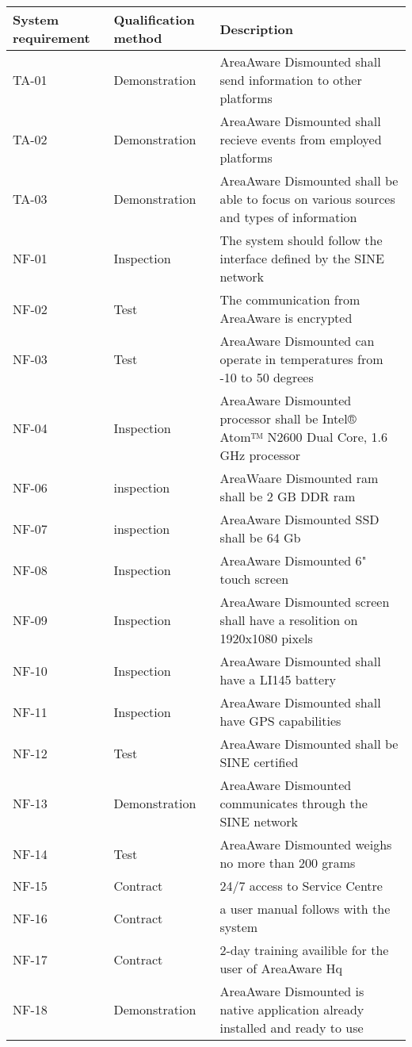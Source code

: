 \begin{longtable}{| p{2.4cm}  | p{2.6cm} | p{6.6cm} |  }
	\hline
	\textbf{System requirement}	& \textbf{Qualification method} & \textbf{Description} \\ \hline
	TA-01	& Demonstration	& AreaAware Dismounted shall send information to other platforms \\ \hline
	TA-02	& Demonstration	& AreaAware Dismounted shall recieve events from employed platforms \\ \hline
	TA-03	& Demonstration	& AreaAware Dismounted shall be able to focus on various sources and types of information \\ \hline 
	NF-01	& Inspection	& The system should follow the interface defined by the SINE network \\ \hline
	NF-02	& Test			& The communication from AreaAware is encrypted  \\ \hline
	NF-03	& Test			& AreaAware Dismounted can operate in temperatures from -10 to 50 degrees \\ \hline
	NF-04	& Inspection	& AreaAware Dismounted processor shall be Intel® Atom™ N2600 Dual Core, 1.6 GHz processor \\ \hline
	NF-06	& inspection	& AreaWaare Dismounted ram shall be 2 GB DDR ram \\ \hline
	NF-07	& inspection	& AreaAware Dismounted SSD shall be 64 Gb \\ \hline
	NF-08	& Inspection	& AreaAware Dismounted 6" touch screen \\ \hline
	NF-09	& Inspection	& AreaAware Dismounted screen shall have a resolition on 1920x1080 pixels  \\ \hline
	NF-10	& Inspection	& AreaAware Dismounted shall have a LI145 battery \\ \hline
	NF-11	& Inspection	& AreaAware Dismounted shall have GPS capabilities \\ \hline
	NF-12	& Test			& AreaAware Dismounted shall be SINE certified \\ \hline
	NF-13	& Demonstration	& AreaAware Dismounted communicates through the SINE network \\ \hline
	NF-14	& Test			& AreaAware Dismounted  weighs no more than 200 grams\\ \hline
	NF-15	& Contract		& 24/7 access to Service Centre\\ \hline
	NF-16	& Contract		& a user manual follows with the system\\ \hline
	NF-17	& Contract		& 2-day training availible for the user of AreaAware Hq \\ \hline
	NF-18	& Demonstration	& AreaAware Dismounted is native application already installed and ready to use \\ \hline
\end{longtable}
